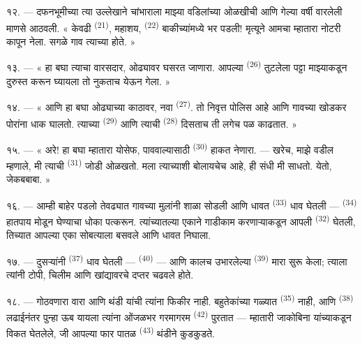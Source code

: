 १२. --- दफनभूमीच्या त्या उल्लेखाने चांभाराला माझ्या वडिलांच्या ओळखीची आणि गेल्या वर्षी वारलेली
माणसे आठवली. « केवढी  \textsuperscript{(21)}, महाशय, 
\textsuperscript{(22)} बाकीच्यांमध्ये भर पडली! मृत्यूने आमचा म्हातारा नोटरी कापून नेला. सगळे
गाव त्याच्या  होते. »

१३. --- « हा बघा त्याचा वारसदार, ओढ्यावर घसरत जाणारा. आपल्या 
\textsuperscript{(26)} तुटलेला पट्टा माझ्याकडून दुरुस्त करून घ्यायला तो नुकताच येऊन गेला. »

१४. --- « आणि हा बघा ओढ्याच्या काठावर, नवा  \textsuperscript{(27)}. तो निवृत्त
पोलिस आहे आणि गावच्या खोडकर पोरांना धाक घालतो. त्याच्या 
\textsuperscript{(29)} आणि त्याची  \textsuperscript{(28)} दिसताच ती लगेच पळ
काढतात. »

१५. --- « अरे! हा बघा म्हातारा योसेफ, पाववाल्यासाठी 
\textsuperscript{(30)} हाकत नेणारा. --- खरेच, माझे वडील म्हणाले, मी त्याची 
\textsuperscript{(31)} जोडी ओळखतो. मला त्याच्याशी बोलायचेच आहे, ही संधी मी साधतो. येतो,
जेकबबाबा. »

१६. --- आम्ही बाहेर पडलो तेवढ्यात गावच्या मुलांनी शाळा सोडली आणि धावत 
\textsuperscript{(33)} धाव घेतली —  \textsuperscript{(34)} हातपाय मोडून घेण्याचा
धोका पत्करून. त्यांच्यातल्या एकाने गाडीकाम करणाऱ्याकडून आपली 
\textsuperscript{(32)} घेतली, तिच्यात आपल्या एका सोबत्याला बसवले आणि धावत निघाला.

१७. --- दुसऱ्यांनी  \textsuperscript{(37)} धाव घेतली —
 \textsuperscript{(40)} — आणि कालच उभारलेल्या 
\textsuperscript{(39)} मारा सुरू केला; त्याला त्यांनी टोपी, चिलीम आणि खांद्यावरचे दप्तर चढवले
होते.

१८. --- गोठवणारा वारा आणि थंडी यांची त्यांना फिकीर नाही. बहुतेकांच्या गळ्यात 
\textsuperscript{(35)} नाही, आणि  \textsuperscript{(38)}
लढाईनंतर पुन्हा ऊब यायला त्यांना ओंजळभर गरमागरम  \textsuperscript{(42)} पुरतात
— म्हातारी  जाकोबिना यांच्याकडून विकत घेतलेले, जी आपल्या फार पातळ
 \textsuperscript{(43)} थंडीने कुडकुडते.

\VUsaut{3.0mm}
\VUsaut{3.0mm}

